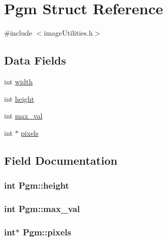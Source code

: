 \hypertarget{struct_pgm}{}\section{Pgm Struct Reference}
\label{struct_pgm}


{\ttfamily \#include $<$image\+Utilities.\+h$>$}

\subsection*{Data Fields}
\begin{DoxyCompactItemize}
\item 
int \hyperlink{struct_pgm_a093d928bb493b2da54111430b9892431}{width}
\item 
int \hyperlink{struct_pgm_a63916fb4e37e9dacde69a357d1ce1792}{height}
\item 
int \hyperlink{struct_pgm_ae08337a7a42cdc9b14471182c5b273df}{max\+\_\+val}
\item 
int $\ast$ \hyperlink{struct_pgm_ae17366c9c7b4703933dffc77ba68b77c}{pixels}
\end{DoxyCompactItemize}


\subsection{Field Documentation}
\hypertarget{struct_pgm_a63916fb4e37e9dacde69a357d1ce1792}{}
\subsubsection[{height}]{\setlength{\rightskip}{0pt plus 5cm}int Pgm\+::height}\label{struct_pgm_a63916fb4e37e9dacde69a357d1ce1792}
\hypertarget{struct_pgm_ae08337a7a42cdc9b14471182c5b273df}{}
\subsubsection[{max\+\_\+val}]{\setlength{\rightskip}{0pt plus 5cm}int Pgm\+::max\+\_\+val}\label{struct_pgm_ae08337a7a42cdc9b14471182c5b273df}
\hypertarget{struct_pgm_ae17366c9c7b4703933dffc77ba68b77c}{}
\subsubsection[{pixels}]{\setlength{\rightskip}{0pt plus 5cm}int$\ast$ Pgm\+::pixels}\label{struct_pgm_ae17366c9c7b4703933dffc77ba68b77c}
\hypertarget{struct_pgm_a093d928bb493b2da54111430b9892431}{}
